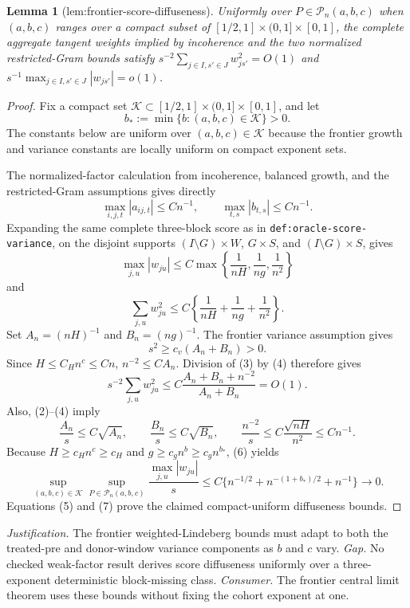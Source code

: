 \documentclass{article}
\newtheorem{lemma}{Lemma}
\begin{document}
\begin{lemma}[lem:frontier-score-diffuseness]\label{lem:frontier-score-diffuseness}
Uniformly over \(P\in\mathcal P_n(a,b,c)\) when \((a,b,c)\) ranges over a compact subset of \([1/2,1]\times(0,1]\times[0,1]\), the complete aggregate tangent weights implied by incoherence and the two normalized restricted-Gram bounds satisfy \(s^{-2}\sum_{j\in I,s'\in J}w_{js'}^2=O(1)\) and \(s^{-1}\max_{j\in I,s'\in J}|w_{js'}|=o(1)\).
\end{lemma}
\begin{proof}
Fix a compact set \(\mathcal K\subset[1/2,1]\times(0,1]\times[0,1]\), and let
\[
 b_*:=\min\{b:(a,b,c)\in\mathcal K\}>0.
\]
The constants below are uniform over \((a,b,c)\in\mathcal K\) because the frontier growth and variance constants are locally uniform on compact exponent sets.

The normalized-factor calculation from incoherence, balanced growth, and the restricted-Gram assumptions gives directly
\[
 \max_{i,j,t}|a_{ij,t}|\le Cn^{-1},
 \qquad
 \max_{t,s}|b_{t,s}|\le Cn^{-1}.
 \tag{1}
\]
Expanding the same complete three-block score as in \texttt{def:oracle-score-variance}, on the disjoint supports \((I\setminus G)\times W\), \(G\times S\), and \((I\setminus G)\times S\), gives
\[
 \max_{j,u}|w_{ju}|
 \le C\max\left\{\frac1{nH},\frac1{ng},\frac1{n^2}\right\}
 \tag{2}
\]
and
\[
 \sum_{j,u}w_{ju}^2
 \le C\left\{\frac1{nH}+\frac1{ng}+\frac1{n^2}\right\}.
 \tag{3}
\]
Set \(A_n=(nH)^{-1}\) and \(B_n=(ng)^{-1}\).  The frontier variance assumption gives
\[
 s^2\ge c_v(A_n+B_n)>0.
 \tag{4}
\]
Since \(H\le C_Hn^c\le Cn\), \(n^{-2}\le CA_n\).  Division of (3) by (4) therefore gives
\[
 s^{-2}\sum_{j,u}w_{ju}^2
 \le C\frac{A_n+B_n+n^{-2}}{A_n+B_n}=O(1).
 \tag{5}
\]
Also, (2)--(4) imply
\[
 \frac{A_n}{s}\le C\sqrt{A_n},
 \qquad
 \frac{B_n}{s}\le C\sqrt{B_n},
 \qquad
 \frac{n^{-2}}s\le C\frac{\sqrt{nH}}{n^2}\le Cn^{-1}.
 \tag{6}
\]
Because \(H\ge c_Hn^c\ge c_H\) and \(g\ge c_gn^b\ge c_gn^{b_*}\), (6) yields
\[
 \sup_{(a,b,c)\in\mathcal K}\sup_{P\in\mathcal P_n(a,b,c)}
 \frac{\max_{j,u}|w_{ju}|}{s}
 \le C\{n^{-1/2}+n^{-(1+b_*)/2}+n^{-1}\}
 \longrightarrow0.
 \tag{7}
\]
Equations (5) and (7) prove the claimed compact-uniform diffuseness bounds.
\end{proof}
\par\smallskip\noindent \textit{Justification.} The frontier weighted-Lindeberg bounds must adapt to both the treated-pre and donor-window variance components as \(b\) and \(c\) vary. \textit{Gap.} No checked weak-factor result derives score diffuseness uniformly over a three-exponent deterministic block-missing class. \textit{Consumer.} The frontier central limit theorem uses these bounds without fixing the cohort exponent at one.
\end{document}
